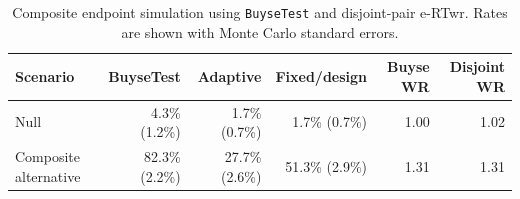 \begin{table}[htbp]
\centering
\caption{Composite endpoint simulation using \texttt{BuyseTest} and disjoint-pair e-RTwr. Rates are shown with Monte Carlo standard errors.}
\begin{tabular}{@{}lrrrrr@{}}
\toprule
Scenario & BuyseTest & Adaptive & Fixed/design & Buyse WR & Disjoint WR \\
\midrule
Null & 4.3\% (1.2\%) & 1.7\% (0.7\%) & 1.7\% (0.7\%) & 1.00 & 1.02 \\
Composite alternative & 82.3\% (2.2\%) & 27.7\% (2.6\%) & 51.3\% (2.9\%) & 1.31 & 1.31 \\
\bottomrule
\end{tabular}
\label{tab:ertwr_composite}
\end{table}
